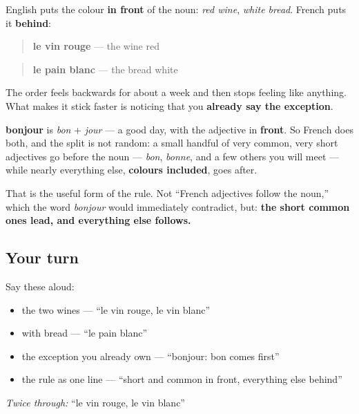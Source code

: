 \begin{grammarlens}[title={Grammar Lens: the colour comes second}]
English puts the colour \textbf{in front} of the noun: \emph{red wine}, \emph{white bread}. French puts it \textbf{behind}:

\begin{quote}
\textbf{le vin rouge} — the wine red
\end{quote}

\begin{quote}
\textbf{le pain blanc} — the bread white
\end{quote}

The order feels backwards for about a week and then stops feeling like anything. What makes it stick faster is noticing that you \textbf{already say the exception}.

\textbf{bonjour} is \emph{bon} + \emph{jour} — a good day, with the adjective in \textbf{front}. So French does both, and the split is not random: a small handful of very common, very short adjectives go before the noun — \emph{bon}, \emph{bonne}, and a few others you will meet — while nearly everything else, \textbf{colours included}, goes after.

That is the useful form of the rule. Not \textquotedblleft{}French adjectives follow the noun,\textquotedblright{} which the word \emph{bonjour} would immediately contradict, but: \textbf{the short common ones lead, and everything else follows.}
\end{grammarlens}

\subsection*{Your turn}
Say these aloud:

\begin{itemize}
\raggedright
  \item the two wines — \textquotedblleft{}le vin rouge, le vin blanc\textquotedblright{}
  \item with bread — \textquotedblleft{}le pain blanc\textquotedblright{}
  \item the exception you already own — \textquotedblleft{}bonjour: bon comes first\textquotedblright{}
  \item the rule as one line — \textquotedblleft{}short and common in front, everything else behind\textquotedblright{}
\end{itemize}

\emph{Twice through:} \textquotedblleft{}le vin rouge, le vin blanc\textquotedblright{}

